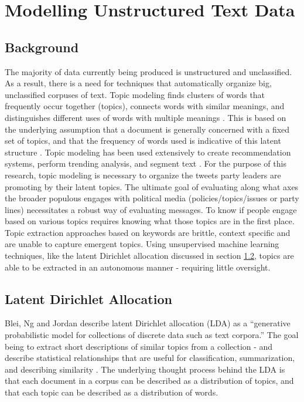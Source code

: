 \chapter{Modelling Unstructured Text Data}\label{ch:TopicModelling}

\section{Background}

The majority of data currently being produced is unstructured and unclassified.
As a result, there is a need for techniques that automatically organize big,
unclassified corpuses of text. Topic modeling finds clusters of words that
frequently occur together (topics), connects words with similar meanings, and
distinguishes different uses of words with multiple meanings
\cite{alghamdi2015survey}. This is based on the underlying assumption that a
document is generally concerned with a fixed set of topics, and that the
frequency of words used is indicative of this latent structure
\cite{blei2003latent}. Topic modeling has been used extensively to create
recommendation systems, perform trending analysis, and segment text
\cite{alghamdi2015survey}. For the purpose of this research, topic modeling is
necessary to organize the tweets party leaders are promoting by their latent
topics. The ultimate goal of evaluating along what axes the broader populous
engages with political media (policies/topics/issues or party lines)
necessitates a robust way of evaluating messages. To know if people engage based
on various topics requires knowing what those topics are in the first place.
Topic extraction approaches based on keywords are brittle, context specific and
are unable to capture emergent topics. Using unsupervised machine learning
techniques, like the latent Dirichlet allocation discussed in section
\ref{sec:LDA}, topics are able to be extracted in an autonomous manner -
requiring little oversight.

\section{Latent Dirichlet Allocation}\label{sec:LDA}

Blei, Ng and Jordan describe latent Dirichlet allocation (LDA) as a “generative
probabilistic model for collections of discrete data such as text corpora.” The
goal being to extract short descriptions of similar topics from a collection -
and describe statistical relationships that are useful for classification,
summarization, and describing similarity \cite{blei2003latent}. The underlying
thought process behind the LDA is that each document in a corpus can be
described as a distribution of topics, and that each topic can be described as a
distribution of words. 

